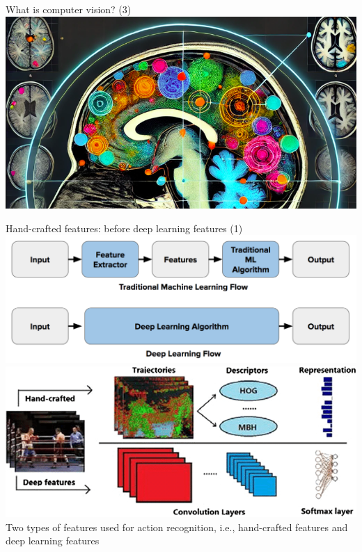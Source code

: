 \documentclass[default, aspectratio=169]{beamer}
\begin{document}
	\begin{frame}{What is computer vision? (3)}
		\centering
		\includegraphics[keepaspectratio, scale=0.7]{pic/medical.png}		
	\end{frame}
	\begin{frame}{Hand-crafted features: before deep learning features (1)}
		\centering
		\includegraphics[keepaspectratio, scale=0.44]{pic/handcrafted_features.png}\\
		\includegraphics[keepaspectratio, scale=0.27]{pic/Two-types-of-features-used-for-action-recognition-ie-hand-crafted-features-and-deep.png}
		\\ \small {Two types of features used for action recognition, i.e., hand-crafted features and deep learning features
		}
	\end{frame}
\end{document}
